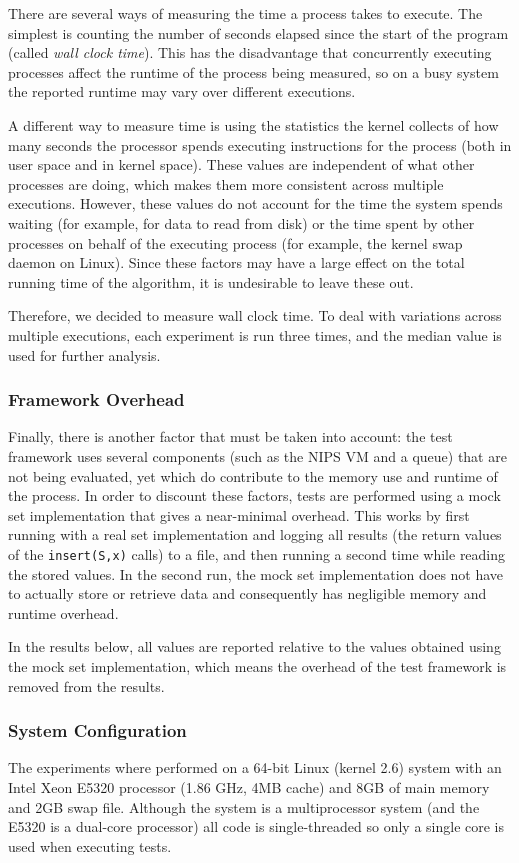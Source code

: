 \documentclass{acm_proc_article-sp}
\begin{document}
There are several ways of measuring the time a process takes to execute.
The simplest is counting the number of seconds elapsed since the start of the
program (called \emph{wall clock time}).
This has the disadvantage that concurrently executing processes affect the runtime
of the process being measured, so on a busy system the reported runtime may vary
over different executions.

A different way to measure time is using the statistics the kernel collects
of how many seconds the processor spends executing instructions for the process
(both in user space and in kernel space). These values are independent of
what other processes are doing, which makes them more consistent across
multiple executions. However, these values do not account for the time the
system spends waiting (for example, for data to read from disk)
or the time spent by other processes on behalf of the executing process
(for example, the kernel swap daemon on Linux). Since these factors may have
a large effect on the total running time of the algorithm, it is undesirable
to leave these out.

Therefore, we decided to measure wall clock time. To deal with variations
across multiple executions, each experiment is run three times, and the median
value is used for further analysis.

\subsubsection{Framework Overhead}
Finally, there is another factor that must be taken into account: the test
framework uses several components (such as the NIPS VM and a queue) that are
not being evaluated, yet which do contribute to the memory use and runtime
of the process. In order to discount these factors, tests are performed using
a mock set implementation that gives a near-minimal overhead. This works
by first running with a real set implementation and logging all results
(the return values of the \verb#insert(S,x)# calls) to a file, and then
running a second time while reading the stored values. In the second run,
the mock set implementation does not have to actually store or retrieve
data and consequently has negligible memory and runtime overhead.

In the results below, all values are reported relative to the values obtained
using the mock set implementation, which means the overhead of the test
framework is removed from the results.

\subsubsection{System Configuration}
The experiments where performed on a 64-bit Linux (kernel 2.6) system
with an Intel Xeon E5320 processor (1.86 GHz, 4MB cache) and 8GB of main
memory and 2GB swap file. Although the system is a multiprocessor system
(and the E5320 is a dual-core processor) all code is single-threaded so
only a single core is used when executing tests.
\end{document}
